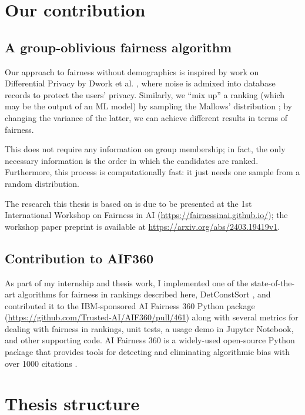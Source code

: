 \section{Our contribution}\label{sect:int_4}

\subsection{A group-oblivious fairness algorithm}

Our approach to fairness without demographics is inspired by work on Differential Privacy by Dwork et al. \cite{foundationsofDPDwork}, where noise is admixed into database records to protect the users’ privacy. Similarly, we “mix up” a ranking (which may be the output of an ML model) by sampling the Mallows’ distribution \cite{mallows}; by changing the variance of the latter, we can achieve different results in terms of fairness.

This does not require any information on group membership; in fact, the only necessary information is the order in which the candidates are ranked. Furthermore, this process is computationally fast: it just needs one sample from a random distribution.

The research this thesis is based on is due to be presented at the 1st International Workshop on Fairness in AI (\url{https://fairnessinai.github.io/}); the workshop paper preprint is available at \url{https://arxiv.org/abs/2403.19419v1}.

\subsection{Contribution to AIF360}

As part of my internship and thesis work, I implemented one of the state-of-the-art algorithms for fairness in rankings described here, DetConstSort \cite{linkedin}, and contributed it to the IBM-sponsored AI Fairness 360 Python package (\url{https://github.com/Trusted-AI/AIF360/pull/461}) along with several metrics for dealing with fairness in rankings, unit tests, a usage demo in Jupyter Notebook, and other supporting code. AI Fairness 360 is a widely-used open-source Python package that provides tools for detecting and eliminating algorithmic bias with over 1000 citations \cite{8843908}.

\section{Thesis structure}\label{sect:structure}

